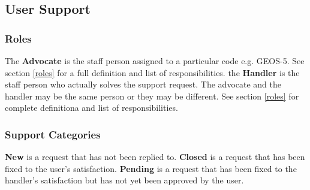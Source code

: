 \subsection{User Support}
\label{usr_support}


\subsubsection{Roles}
The {\bf Advocate} is the staff person assigned to a particular code e.g. GEOS-5. See section \autoref{roles} for a full definition and list of responsibilities. 
the {\bf Handler} is the staff person who actually solves the support request. The advocate and the handler may be the same person or they may be different. See section \autoref{roles} for complete definitiona and list of responsibilities.

\subsubsection{Support Categories}
{\bf New} is a request that has not been replied to.
{\bf Closed} is a request that has been fixed to the user's satisfaction.
{\bf Pending} is a request that has been fixed to the handler's satisfaction but has not yet been approved by the user.


